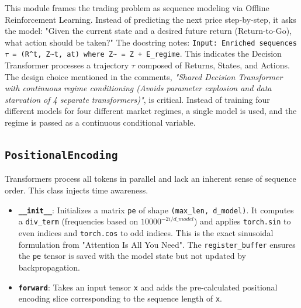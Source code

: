 \documentclass[12pt,a4paper]{report}
\begin{document}
This module frames the trading problem as sequence modeling via Offline Reinforcement Learning. Instead of predicting the next price step-by-step, it asks the model: "Given the current state and a desired future return (Return-to-Go), what action should be taken?" 
The docstring notes: \texttt{Input: Enriched sequences $\tau$ = (R\^{}t, Z\~{}t, at) where Z\~{} = Z + E\_regime}. This indicates the Decision Transformer processes a trajectory $\tau$ composed of Returns, States, and Actions.
The design choice mentioned in the comments, \textit{"Shared Decision Transformer with continuous regime conditioning (Avoids parameter explosion and data starvation of 4 separate transformers)"}, is critical. Instead of training four different models for four different market regimes, a single model is used, and the regime is passed as a continuous conditional variable.

\subsection{\texttt{PositionalEncoding}}
Transformers process all tokens in parallel and lack an inherent sense of sequence order. This class injects time awareness.
\begin{itemize}
    \item \textbf{\texttt{\_\_init\_\_}}: Initializes a matrix \texttt{pe} of shape \texttt{(max\_len, d\_model)}. It computes a \texttt{div\_term} (frequencies based on $10000^{-2i/d\_model}$) and applies \texttt{torch.sin} to even indices and \texttt{torch.cos} to odd indices. This is the exact sinusoidal formulation from "Attention Is All You Need". The \texttt{register\_buffer} ensures the \texttt{pe} tensor is saved with the model state but not updated by backpropagation.
    \item \textbf{\texttt{forward}}: Takes an input tensor \texttt{x} and adds the pre-calculated positional encoding slice corresponding to the sequence length of \texttt{x}.
\end{itemize}
\end{document}
